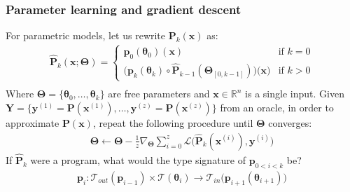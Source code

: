 \documentclass{beamer}
\begin{document}
    \begin{frame}
        \frametitle{Parameter learning and gradient descent}
        For parametric models, let us rewrite $\mathbf{P}_k(\mathbf{x})$ as:
        \begin{align*}
            \mathbf{\hat P}_k(\mathbf{x}; \mathbf{\boldsymbol\Theta}) = \begin{cases} \mathbf{p}_0(\boldsymbol\theta_0)(\mathbf{x}) &\text{if } k=0\\ \big(\mathbf{p}_k(\boldsymbol\theta_k)\circ \mathbf{\hat P}_{k-1}(\boldsymbol\Theta_{[0, k-1]})\big)\big(\mathbf{x}\big)&\text{if } k > 0 \end{cases} \\
        \end{align*}
        Where $\boldsymbol\Theta = \{\boldsymbol\theta_0, \dots, \boldsymbol\theta_k\}$ are free parameters and $\mathbf{x} \in \mathbb{R}^n$ is a single input. Given $\mathbf{Y} = \{\mathbf{y}^{(1)} = \mathbf{P}(\mathbf{x}^{(1)}), \dots, \mathbf{y}^{(z)} = \mathbf{P}(\mathbf{x}^{(z)})\}$ from an oracle, in order to approximate $\mathbf{P}(\mathbf x)$, repeat the following procedure until $\boldsymbol\Theta$ converges:
        \begin{align*}
            \boldsymbol\Theta \leftarrow \boldsymbol\Theta - \frac{1}{z}\nabla_{\boldsymbol\Theta} \sum_{i=0}^z\mathcal{L}\big(\mathbf{\hat P}_k(\mathbf{x}^{(i)}), \mathbf{y}^{(i)}\big)
        \end{align*}
        If $\mathbf{\hat P}_{k}$ were a program, what would the type signature of $\mathbf{p}_{0<i<k}$ be?
        \begin{align*}
            \mathbf{p}_i: \mathcal{T}_{out}(\mathbf{p}_{i-1}) \times \mathcal{T}(\boldsymbol\theta_{i}) \rightarrow \mathcal{T}_{in}\big(\mathbf{p}_{i+1}(\boldsymbol\theta_{i+1})\big)
        \end{align*}
    \end{frame}

\end{document}
